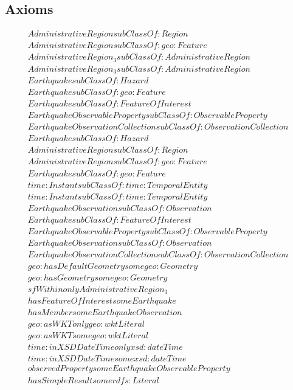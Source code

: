 \subsection{Axioms}
\begin{align}
  AdministrativeRegion subClassOf: Region\\
  AdministrativeRegion subClassOf: geo:Feature\\
  AdministrativeRegion_3 subClassOf: AdministrativeRegion\\
  AdministrativeRegion_3 subClassOf: AdministrativeRegion\\
  Earthquake subClassOf: Hazard\\
  Earthquake subClassOf: geo:Feature\\
  Earthquake subClassOf: FeatureOfInterest\\
  EarthquakeObservableProperty subClassOf: ObservableProperty\\
  EarthquakeObservationCollection subClassOf: ObservationCollection\\
  Earthquake subClassOf: Hazard\\
  AdministrativeRegion subClassOf: Region\\
  AdministrativeRegion subClassOf: geo:Feature\\
  Earthquake subClassOf: geo:Feature\\
  time:Instant subClassOf: time:TemporalEntity\\
  time:Instant subClassOf: time:TemporalEntity\\
  EarthquakeObservation subClassOf: Observation\\
  Earthquake subClassOf: FeatureOfInterest\\
  EarthquakeObservableProperty subClassOf: ObservableProperty\\
  EarthquakeObservation subClassOf: Observation\\
  EarthquakeObservationCollection subClassOf: ObservationCollection\\
  geo:hasDefaultGeometry some geo:Geometry \\
  geo:hasGeometry some geo:Geometry \\
  sfWithin only AdministrativeRegion_3 \\
  hasFeatureOfInterest some Earthquake \\
  hasMember some EarthquakeObservation \\
  geo:asWKT only geo:wktLiteral \\
  geo:asWKT some geo:wktLiteral \\
  time:inXSDDateTime only xsd:dateTime \\
  time:inXSDDateTime some xsd:dateTime \\
  observedProperty some EarthquakeObservableProperty \\
  hasSimpleResult some rdfs:Literal \end{align}


